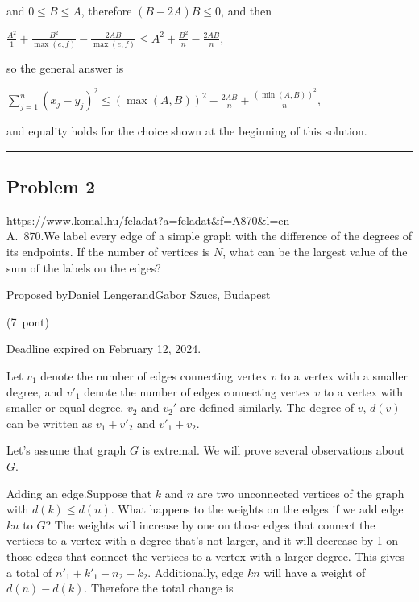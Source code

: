 \documentclass{article}
\begin{document}
and \(\displaystyle 0\le B\le A\), therefore \(\displaystyle (B-2A)B\le 0\), and then

\(\displaystyle \frac{A^2}{1}+\frac{B^2}{\max(e,f)}-\frac{2AB}{\max(e,f)}\le A^2+\frac{B^2}{n}-\frac{2AB}{n},\)

so the general answer is

\(\displaystyle \sum_{j=1}^n (x_j-y_j)^2\le (\max(A,B))^2-\frac{2AB}{n}+\frac{(\min(A,B))^2}{n},\)

and equality holds for the choice shown at the beginning of this solution.

\vspace{1em}
\hrule
\vspace{1em}

\subsection*{Problem 2}
\noindent\url{https://www.komal.hu/feladat?a=feladat&f=A870&l=en}\\[1em]

A. 870.We label every edge of a simple graph with the difference of the degrees of its endpoints. If the number of vertices is \(\displaystyle N\), what can be the largest value of the sum of the labels on the edges?

Proposed byDaniel LengerandGabor Szucs, Budapest

(7 pont)

Deadline expired on February 12, 2024.

Let \(\displaystyle v_1\) denote the number of edges connecting vertex \(\displaystyle v\) to a vertex with a smaller degree, and \(\displaystyle v'_1\) denote the number of edges connecting vertex \(\displaystyle v\) to a vertex with smaller or equal degree. \(\displaystyle v_2\) and \(\displaystyle v_2'\) are defined similarly. The degree of \(\displaystyle v\), \(\displaystyle d(v)\) can be written as \(\displaystyle v_1+v'_2\) and \(\displaystyle v'_1+v_2\).

Let's assume that graph \(\displaystyle G\) is extremal. We will prove several observations about \(\displaystyle G\).

Adding an edge.Suppose that \(\displaystyle k\) and \(\displaystyle n\) are two unconnected vertices of the graph with \(\displaystyle d(k)\le d(n)\). What happens to the weights on the edges if we add edge \(\displaystyle kn\) to \(\displaystyle G\)? The weights will increase by one on those edges that connect the vertices to a vertex with a degree that's not larger, and it will decrease by 1 on those edges that connect the vertices to a vertex with a larger degree. This gives a total of \(\displaystyle n'_1+k'_1-n_2-k_2\). Additionally, edge \(\displaystyle kn\) will have a weight of \(\displaystyle d(n)-d(k)\). Therefore the total change is
\end{document}
